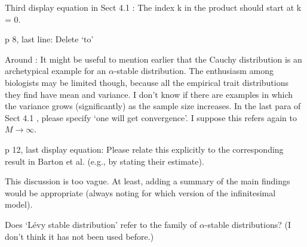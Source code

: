 
\begin{point}{\revref}
Third display equation in Sect 4.1 \revref: The index k in the product should start at k = 0.
\end{point}


\begin{point}{\revref}
p 8, last line: Delete ‘to’
\end{point}


\begin{point}{}
Around : It might be useful to mention earlier that the Cauchy distribution is an archetypical
example for an $\alpha$-stable distribution. The enthusiasm among biologists may be limited
though, because all the empirical trait distributions they find have mean and variance. I
don’t know if there are examples in which the variance grows (significantly) as the sample
size increases. In the last para of Sect 4.1 \revref, please specify ‘one will get convergence’. I
suppose this refers again to $M \to \infty$.
\end{point}


\begin{point}{}
p 12, last display equation: Please relate this explicitly to the corresponding result in
Barton et al. (e.g., by stating their estimate).
\end{point}


\begin{point}{\revref}
This discussion is too vague. At least, adding a summary of the main findings
would be appropriate (always noting for which version of the infinitesimal model).
\end{point}


\begin{point}{\revref}
Does `Lévy stable distribution’ refer to the family of $\alpha$-stable
distributions? (I don’t think it has not been used before.)
\end{point}

